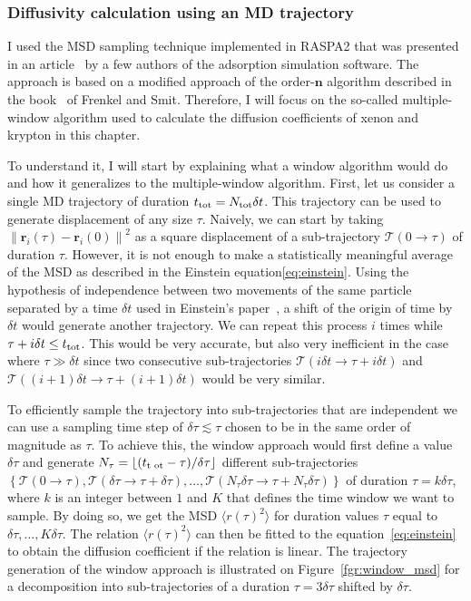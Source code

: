 \documentclass[main]{subfiles}
\begin{document}
\subsubsection{Diffusivity calculation using an MD trajectory}

I used the MSD sampling technique implemented in RASPA2\autocite{dubbeldam2016} that was presented in an article~\cite{Dubbeldam_2009} by a few authors of the adsorption simulation software. The approach is based on a modified approach of the order-$\mathbf{n}$ algorithm described in the book~\cite{frenkel2001msd} of Frenkel and Smit. Therefore, I will focus on the so-called multiple-window algorithm used to calculate the diffusion coefficients of xenon and krypton in this chapter. 

To understand it, I will start by explaining what a window algorithm would do and how it generalizes to the multiple-window algorithm.
First, let us consider a single MD trajectory of duration $t_{\text{tot}}=N_{\text{tot}}\delta t$. This trajectory can be used to generate displacement of any size $\tau$. Naively, we can start by taking ${\lVert\mathbf{r}_i(\tau)-\mathbf{r}_i(0)\rVert}^2$ as a square displacement of a sub-trajectory $\mathcal{T}(0\rightarrow\tau)$ of duration $\tau$. 
However, it is not enough to make a statistically meaningful average of the MSD as described in the Einstein equation\ref{eq:einstein}. Using the hypothesis of independence between two movements of the same particle separated by a time $\delta t$ used in Einstein's paper~\cite{einstein1905motion}, a shift of the origin of time by $\delta t$ would generate another trajectory. We can repeat this process $i$ times while $\tau + i\delta t\leq t_{\text{tot}}$. This would be very accurate, but also very inefficient in the case where $\tau \gg \delta t$ since two consecutive sub-trajectories $\mathcal{T}(i\delta t\rightarrow\tau+i\delta t)$ and $\mathcal{T}((i+1)\delta t\rightarrow\tau+(i+1)\delta t)$ would be very similar. 

To efficiently sample the trajectory into sub-trajectories that are independent we can use a sampling time step of $\delta \tau\lesssim\tau$ chosen to be in the same order of magnitude as $\tau$. To achieve this, the window approach would first define a value $\delta \tau$ and generate $N_{\tau} = \lfloor(t_{\text{t ot}} -\tau)/ \delta\tau \rfloor$ different sub-trajectories $\left\{\mathcal{T}(0\rightarrow\tau), \mathcal{T}(\delta\tau\rightarrow\tau + \delta\tau), \ldots, \mathcal{T}(N_{\tau}\delta\tau\rightarrow\tau + N_{\tau}\delta\tau)\right\}$ of duration $\tau=k\delta\tau$, where $k$ is an integer between $1$ and $K$ that defines the time window we want to sample. By doing so, we get the MSD $\langle {r(\tau)}^2 \rangle$ for duration values $\tau$ equal to $\delta\tau, \ldots, K\delta\tau$. The relation $\langle {r(\tau)}^2 \rangle$ can then be fitted to the equation~\ref{eq:einstein} to obtain the diffusion coefficient if the relation is linear. The trajectory generation of the window approach is illustrated on Figure~\ref{fgr:window_msd} for a decomposition into sub-trajectories of a duration $\tau=3\delta\tau$ shifted by $\delta\tau$.
\end{document}
